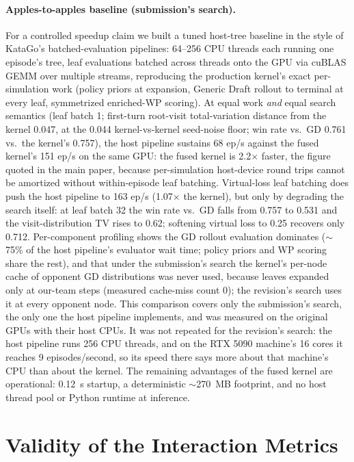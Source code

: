 \documentclass[journal]{IEEEtran}
\begin{document}
\paragraph{Apples-to-apples baseline (submission's search).} For a controlled speedup claim we built a tuned host-tree baseline in the style of KataGo's batched-evaluation pipelines: 64--256 CPU threads each running one episode's tree, leaf evaluations batched across threads onto the GPU via cuBLAS GEMM over multiple streams, reproducing the production kernel's exact per-simulation work (policy priors at expansion, Generic Draft rollout to terminal at every leaf, symmetrized enriched-WP scoring). At equal work \textit{and} equal search semantics (leaf batch 1; first-turn root-visit total-variation distance from the kernel 0.047, at the 0.044 kernel-vs-kernel seed-noise floor; win rate vs.\ GD 0.761 vs.\ the kernel's 0.757), the host pipeline sustains 68 ep/s against the fused kernel's 151 ep/s on the same GPU: the fused kernel is 2.2$\times$ faster, the figure quoted in the main paper, because per-simulation host-device round trips cannot be amortized without within-episode leaf batching. Virtual-loss leaf batching does push the host pipeline to 163 ep/s (1.07$\times$ the kernel), but only by degrading the search itself: at leaf batch 32 the win rate vs.\ GD falls from 0.757 to 0.531 and the visit-distribution TV rises to 0.62; softening virtual loss to 0.25 recovers only 0.712. Per-component profiling shows the GD rollout evaluation dominates ($\sim$75\% of the host pipeline's evaluator wait time; policy priors and WP scoring share the rest), and that under the submission's search the kernel's per-node cache of opponent GD distributions was never used, because leaves expanded only at our-team steps (measured cache-miss count 0); the revision's search uses it at every opponent node. This comparison covers only the submission's search, the only one the host pipeline implements, and was measured on the original GPUs with their host CPUs. It was not repeated for the revision's search: the host pipeline runs 256 CPU threads, and on the RTX 5090 machine's 16 cores it reaches 9 episodes/second, so its speed there says more about that machine's CPU than about the kernel. The remaining advantages of the fused kernel are operational: 0.12~s startup, a deterministic $\sim$270~MB footprint, and no host thread pool or Python runtime at inference.

\section{Validity of the Interaction Metrics}
\label{sec:metricvalid}
\end{document}
